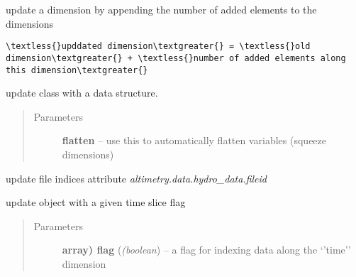 \documentclass[letterpaper,10pt,english]{sphinxmanual}
\begin{document}
\begin{fulllineitems}

\begin{fulllineitems}
\label{altimetry.data:altimetry.data.hydro_data.update_Dim}
update a dimension by appending the number of added elements to the dimensions

\begin{Verbatim}[commandchars=\\\{\}]
\textless{}upddated dimension\textgreater{} = \textless{}old dimension\textgreater{} + \textless{}number of added elements along this dimension\textgreater{}
\end{Verbatim}

\end{fulllineitems}


\begin{fulllineitems}
\label{altimetry.data:altimetry.data.hydro_data.update_dataset}
update class with a data structure.
\begin{quote}\begin{description}
\item[{Parameters}] \leavevmode
\textbf{flatten} -- use this to automatically flatten variables (squeeze dimensions)

\end{description}\end{quote}

\end{fulllineitems}


\begin{fulllineitems}
\label{altimetry.data:altimetry.data.hydro_data.update_fid_list}
update file indices attribute \emph{altimetry.data.hydro\_data.fileid}

\end{fulllineitems}


\begin{fulllineitems}
\label{altimetry.data:altimetry.data.hydro_data.update_with_slice}
update object with a given time slice flag
\begin{quote}\begin{description}
\item[{Parameters}] \leavevmode
\textbf{array) flag} (\emph{(boolean}) -- a flag for indexing data along the `'time'' dimension


\end{description}
\end{quote}
\end{fulllineitems}
\end{fulllineitems}
\end{document}
